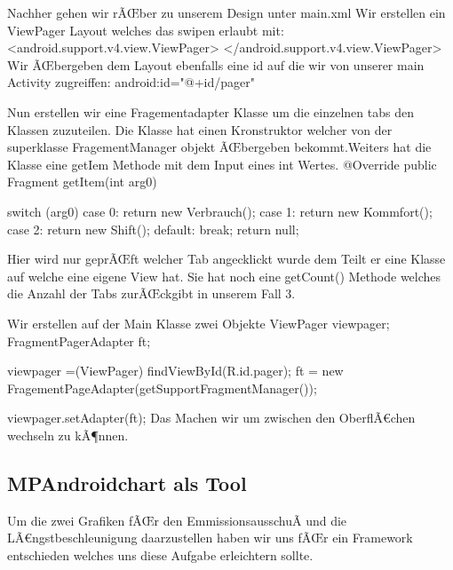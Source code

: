 Nachher gehen wir rÃŒber zu unserem Design unter main.xml
Wir erstellen ein ViewPager Layout welches das swipen erlaubt mit:
<android.support.v4.view.ViewPager> </android.support.v4.view.ViewPager>
Wir ÃŒbergeben dem Layout ebenfalls eine id auf die wir von unserer main Activity zugreiffen: 
android:id="@+id/pager"

Nun erstellen wir eine Fragementadapter Klasse um die einzelnen tabs den Klassen zuzuteilen. 
Die Klasse hat einen Kronstruktor welcher von der superklasse FragementManager objekt ÃŒbergeben bekommt.Weiters hat die Klasse eine getIem Methode mit dem Input eines int Wertes. 
@Override
public Fragment getItem(int arg0) {
	switch (arg0) {
		case 0:
		return new Verbrauch();
		case 1:
		return new Kommfort();
		case 2:
		return new Shift();
		default:
		break;
	}
	return null;
	
}
Hier wird nur geprÃŒft welcher Tab angecklickt wurde dem Teilt er eine Klasse auf welche eine eigene View hat.
Sie hat noch eine getCount() Methode welches die Anzahl der Tabs zurÃŒckgibt in unserem Fall 3.

Wir erstellen auf der Main Klasse zwei Objekte 
ViewPager viewpager;
FragmentPagerAdapter ft;


viewpager =(ViewPager) findViewById(R.id.pager);
ft = new FragementPageAdapter(getSupportFragmentManager());

viewpager.setAdapter(ft);
Das Machen wir um zwischen den OberflÃ€chen wechseln zu kÃ¶nnen.

 \newpage
 
\subsection*{MPAndroidchart als Tool}
Um die zwei Grafiken fÃŒr den EmmissionsausschuÃ und die LÃ€ngstbeschleunigung daarzustellen haben wir uns fÃŒr ein Framework entschieden welches uns diese Aufgabe erleichtern sollte. 


